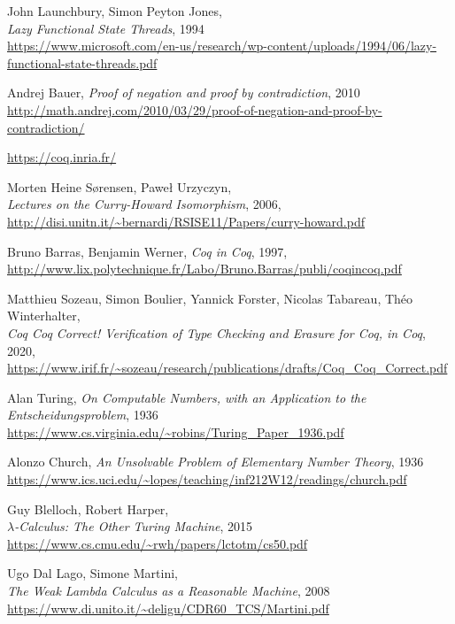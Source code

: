 \documentclass[declaration,mgr,english,shortabstract]{iithesis}
\begin{document}
\begin{thebibliography}{1}
    John Launchbury, Simon Peyton Jones, \\
    \textit{Lazy Functional State Threads}, 1994 \\
    \url{https://www.microsoft.com/en-us/research/wp-content/uploads/1994/06/lazy-functional-state-threads.pdf}

    Andrej Bauer, \textit{Proof of negation and proof by contradiction}, 2010 \\
    \url{http://math.andrej.com/2010/03/29/proof-of-negation-and-proof-by-contradiction/}

    \url{https://coq.inria.fr/}

    Morten Heine Sørensen, Paweł Urzyczyn, \\
    \textit{Lectures on the Curry-Howard Isomorphism}, 2006, \\
    \url{http://disi.unitn.it/~bernardi/RSISE11/Papers/curry-howard.pdf}

    Bruno Barras, Benjamin Werner, \textit{Coq in Coq}, 1997, \\
    \url{http://www.lix.polytechnique.fr/Labo/Bruno.Barras/publi/coqincoq.pdf}

    Matthieu Sozeau, Simon Boulier, Yannick Forster, Nicolas Tabareau, Théo Winterhalter, \\
    \textit{Coq Coq Correct! Verification of Type Checking and Erasure for Coq, in Coq}, 2020, \\
    \url{https://www.irif.fr/~sozeau/research/publications/drafts/Coq_Coq_Correct.pdf}

    Alan Turing, \textit{On Computable Numbers, with an Application to the Entscheidungsproblem}, 1936 \\
    \url{https://www.cs.virginia.edu/~robins/Turing_Paper_1936.pdf}

    Alonzo Church, \textit{An Unsolvable Problem of Elementary Number Theory}, 1936 \\
    \url{https://www.ics.uci.edu/~lopes/teaching/inf212W12/readings/church.pdf}

    Guy Blelloch, Robert Harper, \\
    \textit{$\lambda$-Calculus: The Other Turing Machine}, 2015 \\
    \url{https://www.cs.cmu.edu/~rwh/papers/lctotm/cs50.pdf}

    Ugo Dal Lago, Simone Martini, \\
    \textit{The Weak Lambda Calculus
    as a Reasonable Machine}, 2008 \\
    \url{https://www.di.unito.it/~deligu/CDR60_TCS/Martini.pdf}


\end{thebibliography}
\end{document}
